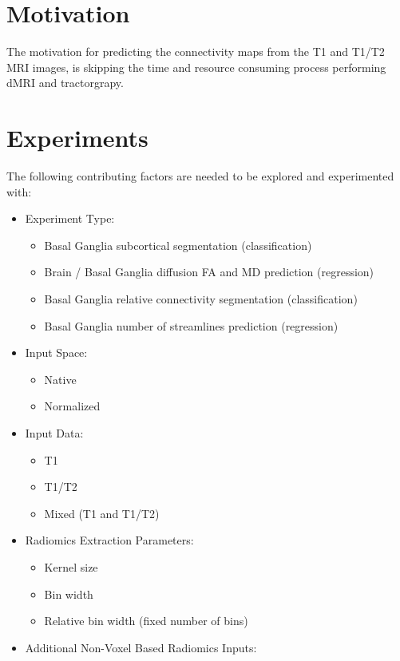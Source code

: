 \section{Motivation}

The motivation for predicting the connectivity maps from the T1 and T1/T2 \ac{MRI} images, is skipping the time and resource consuming process performing \ac{dMRI} and tractorgrapy.

\section{Experiments}

The following contributing factors are needed to be explored and experimented with:
\begin{itemize}
  \item Experiment Type:
  \begin{itemize}
    \item Basal Ganglia subcortical segmentation (classification)
    \item Brain / Basal Ganglia diffusion \ac{FA} and \ac{MD} prediction (regression)
    \item Basal Ganglia relative connectivity segmentation (classification)
    \item Basal Ganglia number of streamlines prediction (regression)
  \end{itemize}
  \item Input Space:
  \begin{itemize}
    \item Native
    \item Normalized
  \end{itemize}
  \item Input Data:
  \begin{itemize}
    \item T1
    \item T1/T2
    \item Mixed (T1 and T1/T2)
  \end{itemize}
  \item Radiomics Extraction Parameters:
  \begin{itemize}
    \item Kernel size
    \item Bin width
    \item Relative bin width (fixed number of bins)
  \end{itemize}
  \item Additional Non-Voxel Based Radiomics Inputs:
  \begin{itemize}

\end{itemize}
\end{itemize}
